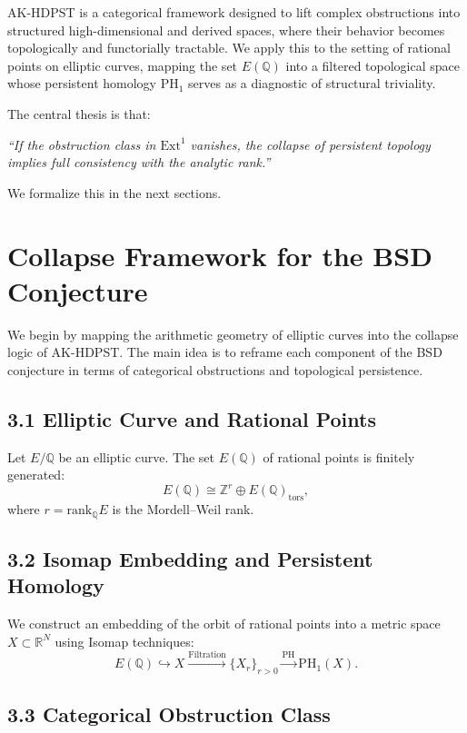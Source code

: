 \documentclass[11pt]{article}
\theoremstyle{definition}
\begin{document}
AK-HDPST is a categorical framework designed to lift complex obstructions into structured high-dimensional and derived spaces, where their behavior becomes topologically and functorially tractable.  
We apply this to the setting of rational points on elliptic curves, mapping the set \( E(\mathbb{Q}) \) into a filtered topological space whose persistent homology \( \mathrm{PH}_1 \) serves as a diagnostic of structural triviality.

\medskip

The central thesis is that:
\begin{center}
\textit{“If the obstruction class in \( \mathrm{Ext}^1 \) vanishes, the collapse of persistent topology implies full consistency with the analytic rank.”}
\end{center}

We formalize this in the next sections.

\section{Collapse Framework for the BSD Conjecture}

We begin by mapping the arithmetic geometry of elliptic curves into the collapse logic of AK-HDPST. The main idea is to reframe each component of the BSD conjecture in terms of categorical obstructions and topological persistence.

\subsection{3.1 Elliptic Curve and Rational Points}

Let \( E/\mathbb{Q} \) be an elliptic curve. The set \( E(\mathbb{Q}) \) of rational points is finitely generated:
\[
E(\mathbb{Q}) \cong \mathbb{Z}^r \oplus E(\mathbb{Q})_{\text{tors}},
\]
where \( r = \mathrm{rank}_\mathbb{Q}E \) is the Mordell–Weil rank.

\subsection{3.2 Isomap Embedding and Persistent Homology}

We construct an embedding of the orbit of rational points into a metric space \( X \subset \mathbb{R}^N \) using Isomap techniques:
\[
E(\mathbb{Q}) \hookrightarrow X \xrightarrow{\mathrm{Filtration}} \{ X_r \}_{r > 0} \xrightarrow{\mathrm{PH}} \mathrm{PH}_1(X).
\]

\subsection{3.3 Categorical Obstruction Class}
\end{document}
